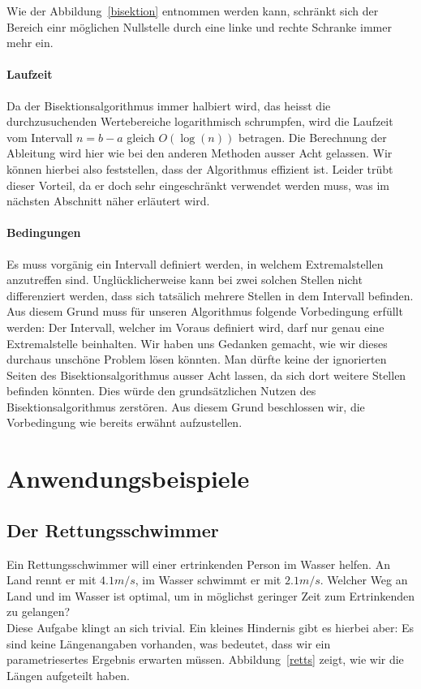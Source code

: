 \documentclass[10pt]{article}         %
\begin{document}
Wie der Abbildung~\ref{bisektion} entnommen werden kann, schränkt sich der Bereich einr möglichen Nullstelle durch eine linke und rechte Schranke immer mehr ein.

\paragraph{Laufzeit}
Da der Bisektionsalgorithmus immer halbiert wird, das heisst die durchzusuchenden Wertebereiche logarithmisch schrumpfen, wird die Laufzeit vom Intervall $n=b-a$ gleich $O(\log(n))$ betragen. Die Berechnung der Ableitung wird hier wie bei den anderen Methoden ausser Acht gelassen. Wir können hierbei also feststellen, dass der Algorithmus effizient ist. Leider trübt dieser Vorteil, da er doch sehr eingeschränkt verwendet werden muss, was im nächsten Abschnitt näher erläutert wird.

\paragraph{Bedingungen}
Es muss vorgänig ein Intervall definiert werden, in welchem Extremalstellen anzutreffen sind. Unglücklicherweise kann bei zwei solchen Stellen nicht differenziert werden, dass sich tatsälich mehrere Stellen in dem Intervall befinden. Aus diesem Grund muss für unseren Algorithmus folgende Vorbedingung erfüllt werden: Der Intervall, welcher im Voraus definiert wird, darf nur genau eine Extremalstelle beinhalten. Wir haben uns Gedanken gemacht, wie wir dieses durchaus unschöne Problem lösen könnten. Man dürfte keine der ignorierten Seiten des Bisektionsalgorithmus ausser Acht lassen, da sich dort weitere Stellen befinden könnten. Dies würde den grundsätzlichen Nutzen des Bisektionsalgorithmus zerstören. Aus diesem Grund beschlossen wir, die Vorbedingung wie bereits erwähnt aufzustellen.

\pagebreak
\section{Anwendungsbeispiele}
\subsection{Der Rettungsschwimmer}
Ein Rettungsschwimmer will einer ertrinkenden Person im Wasser helfen. An Land rennt er mit $4.1 m/s$, im Wasser schwimmt er mit $2.1 m/s$. Welcher Weg an Land und im Wasser ist optimal, um in möglichst geringer Zeit zum Ertrinkenden zu gelangen? \\
    Diese Aufgabe klingt an sich trivial. Ein kleines Hindernis gibt es hierbei aber: Es sind keine Längenangaben vorhanden, was bedeutet, dass wir ein parametriesertes Ergebnis erwarten müssen. Abbildung~\ref{retts} zeigt, wie wir die Längen aufgeteilt haben.
\end{document}
